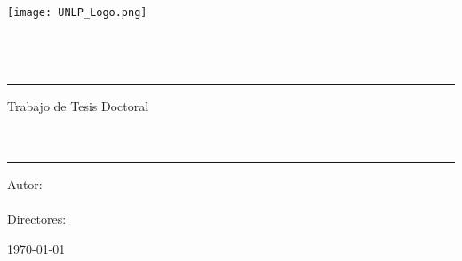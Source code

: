 \pagestyle{empty}
	\begin{center}

		\texttt{[image: UNLP\_Logo.png]}\\[1.5cm]%

		{\LARGE \textsc{\myUni}}\\[0.3cm]
		{\Large \textsc{\myFaculty}}\\[0.3cm]
		{\Large \textsc{\myDepartment}}\\[2cm]

		\hrule
		{\Large Trabajo de Tesis Doctoral}\\[1cm]
		
		{\Huge \textbf{\myTitle}}\\[1cm] %
		{\Huge \textit{\mySubtitle}}\\[0.6cm]
		\hrule

		\vspace{1cm}

		{
			\Large
			Autor:\\
			\myName
		}\\[1.5cm]

		{
			\Large
			Directores:\\
			\mySupervisor
		}

		\vfill
		\large \today

	\end{center}
